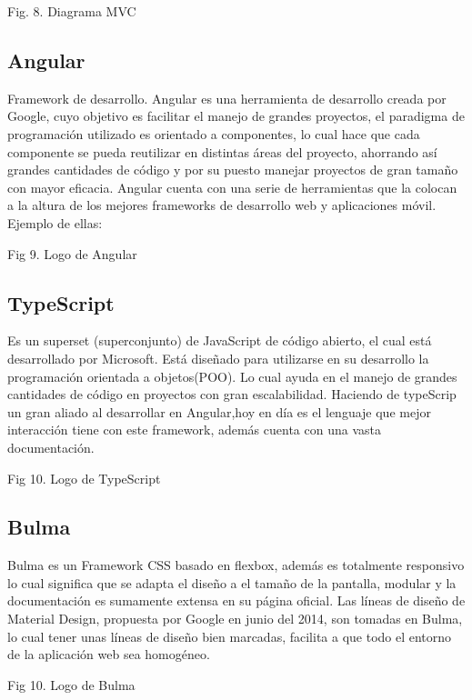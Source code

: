 Fig. 8. Diagrama MVC





\subsection{Angular}
Framework de desarrollo.
Angular es una herramienta de desarrollo creada por Google, cuyo objetivo es facilitar el manejo de grandes proyectos, el paradigma de programación utilizado es orientado a componentes, lo cual hace que cada componente se pueda reutilizar en distintas áreas del proyecto, ahorrando así grandes cantidades de código y por su puesto manejar proyectos de gran tamaño con mayor eficacia. Angular cuenta con una serie de herramientas que la colocan a la altura de los mejores frameworks de desarrollo web y aplicaciones móvil. Ejemplo de ellas:


Fig 9. Logo de Angular



\subsection{TypeScript}
Es un superset (superconjunto) de JavaScript de código abierto, el cual está desarrollado por Microsoft. Está diseñado para utilizarse en su desarrollo la programación orientada a objetos(POO). Lo cual ayuda en el manejo de grandes cantidades de código en proyectos con gran escalabilidad. Haciendo de typeScrip un gran aliado al desarrollar en Angular,hoy en día es el lenguaje que mejor interacción tiene con este framework, además cuenta con una vasta documentación.




Fig 10. Logo de TypeScript



\subsection{Bulma}
Bulma es un Framework CSS basado en flexbox, además es totalmente responsivo lo cual significa que se adapta el diseño a el tamaño de la pantalla, modular y la documentación es sumamente extensa en su página oficial.
Las líneas de diseño de Material Design, propuesta por Google en junio del 2014, son tomadas en Bulma, lo cual tener unas líneas de diseño bien marcadas, facilita a que todo el entorno de la aplicación web sea homogéneo.


Fig 10. Logo de Bulma


